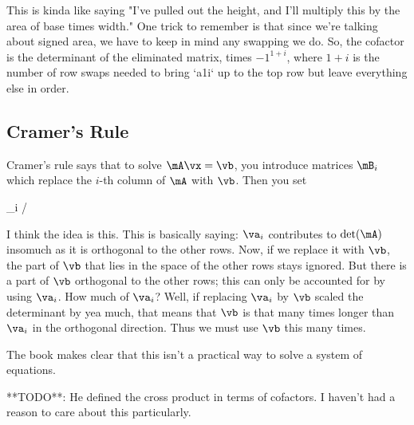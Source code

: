 This is kinda like saying "I've pulled out the height, and I'll multiply
this by the area of base times width." One trick to remember is that
since we're talking about signed area, we have to keep in mind any
swapping we do. So, the cofactor is the determinant of the eliminated
matrix, times $-1^{1+i}$, where $1+i$ is the number of row swaps needed
to bring `a1i` up to the top row but leave everything else in order.

\subsection{Cramer's Rule}

Cramer's rule says that to solve $\mA\vx=\vb$, you introduce matrices
$\mB_i$ which replace the $i$-th column of $\mA$ with $\vb$. Then you
set

\begin{nedqn}
  \vx_i
\eqcol
  /\detf{\mA}
\end{nedqn}

I think the idea is this. This is basically saying: $\va_i$ contributes
to $\detf{\mA}$ insomuch as it is orthogonal to the other rows. Now, if
we replace it with $\vb$, the part of $\vb$ that lies in the space of
the other rows stays ignored. But there is a part of $\vb$ orthogonal to
the other rows; this can only be accounted for by using $\va_i$. How
much of $\va_i$? Well, if replacing $\va_i$ by $\vb$ scaled the
determinant by yea much, that means that $\vb$ is that many times longer
than $\va_i$ in the orthogonal direction. Thus we must use $\vb$ this
many times.

The book makes clear that this isn't a practical way to solve a system
of equations.

**TODO**: He defined the cross product in terms of cofactors. I
haven't had a reason to care about this particularly.

